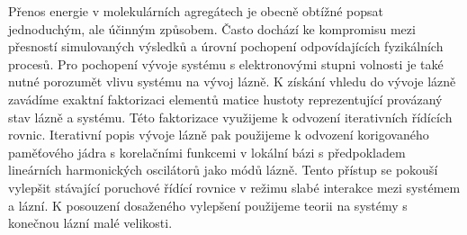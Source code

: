 \documentclass[12pt]{report}
\begin{document}

Přenos energie v molekulárních agregátech je obecně obtížné popsat jednoduchým, ale účinným způsobem. Často dochází ke kompromisu mezi přesností simulovaných výsledků a úrovní pochopení odpovídajících fyzikálních procesů. Pro pochopení vývoje systému s elektronovými stupni volnosti je také nutné porozumět vlivu systému na vývoj lázně. K získání vhledu do vývoje lázně zavádíme exaktní faktorizaci elementů matice hustoty reprezentující provázaný stav lázně a systému. Této faktorizace využijeme k odvození iterativních řídících rovnic. Iterativní popis vývoje lázně pak použijeme k odvození korigovaného paměťového jádra s korelačními funkcemi v lokální bázi s předpokladem lineárních harmonických oscilátorů jako módů lázně. Tento přístup se pokouší vylepšit stávající poruchové řídící rovnice v režimu slabé interakce mezi systémem a lázní. K posouzení dosaženého vylepšení použijeme teorii na systémy s konečnou lázní malé velikosti.
\end{document}
